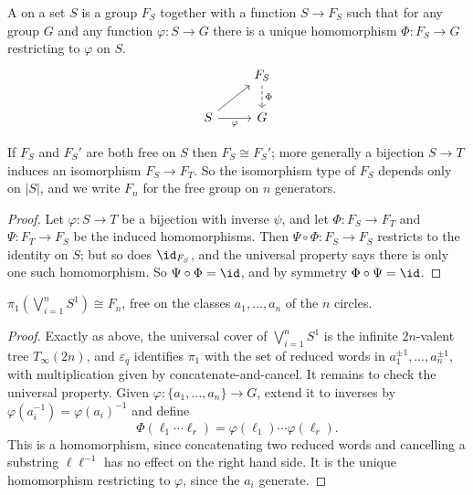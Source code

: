 \begin{definition}
	A  on a set $S$ is a group $F_S$ together with a function $S \to F_S$ such that for any group $G$ and any function $\varphi: S \to G$ there is a unique homomorphism $\Phi: F_S \to G$ restricting to $\varphi$ on $S$.
	\[\begin{tikzcd}
		& {F_S} \arrow[d, "\Phi", dashed] \\
		S \arrow[ru] \arrow[r, "\varphi"'] & G
	\end{tikzcd}\]
\end{definition}

\begin{lemma}
	If $F_S$ and $F_S'$ are both free on $S$ then $F_S \cong F_S'$; more generally a bijection $S \to T$ induces an isomorphism $F_S \to F_T$. So the isomorphism type of $F_S$ depends only on $|S|$, and we write $F_n$ for the free group on $n$ generators.
\end{lemma}
\begin{proof}
	Let $\varphi: S \to T$ be a bijection with inverse $\psi$, and let $\Phi: F_S \to F_T$ and $\Psi: F_T \to F_S$ be the induced homomorphisms. Then $\Psi \circ \Phi: F_S \to F_S$ restricts to the identity on $S$; but so does $\id_{F_S}$, and the universal property says there is only one such homomorphism. So $\Psi \circ \Phi = \id$, and by symmetry $\Phi \circ \Psi = \id$.
\end{proof}

\begin{theorem} \label{thm:pi1-wedge-circles}
	$\pi_1\!\left(\bigvee_{i=1}^n S^1\right) \cong F_n$, free on the classes $a_1, \dots, a_n$ of the $n$ circles.
\end{theorem}
\begin{proof}
	Exactly as above, the universal cover of $\bigvee_{i=1}^n S^1$ is the infinite $2n$-valent tree $T_\infty(2n)$, and $\varepsilon_q$ identifies $\pi_1$ with the set of reduced words in $a_1^{\pm1},\dots,a_n^{\pm1}$, with multiplication given by concatenate-and-cancel. It remains to check the universal property. Given $\varphi: \{a_1,\dots,a_n\} \to G$, extend it to inverses by $\varphi(a_i^{-1}) = \varphi(a_i)^{-1}$ and define
	$$
	\Phi(\ell_1\cdots\ell_r) = \varphi(\ell_1)\cdots\varphi(\ell_r).
	$$
	This is a homomorphism, since concatenating two reduced words and cancelling a substring $\ell\ell^{-1}$ has no effect on the right hand side. It is the unique homomorphism restricting to $\varphi$, since the $a_i$ generate.
\end{proof}

